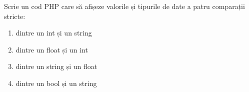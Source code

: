 \begin{Exercise}[title={Verifică-ți puterea de a face analogii},difficulty=1]
Scrie un cod PHP care să afișeze valorile și tipurile de date a patru comparații stricte:
\begin{enumerate}
    \item dintre un int și un string
    \item dintre un float și un int
    \item dintre un string și un float
    \item dintre un bool și un string
\end{enumerate}
\end{Exercise}

